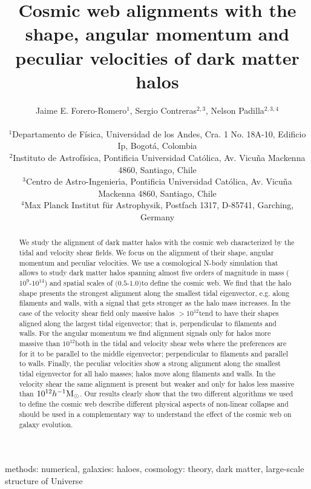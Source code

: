 \documentclass[useAMS,usenatbib]{mn2e}
\newcommand{\hMpc}{{\ifmmode{h^{-1}{\rm Mpc}}\else{$h^{-1}$Mpc }\fi}}
\newcommand{\hMsun}{{\ifmmode{h^{-1}{\rm
        {M_{\odot}}}}\else{$h^{-1}{\rm{M_{\odot}}}$~}\fi}}
\begin{document}
\title[Halo alignments with the cosmic web]{Cosmic web alignments with
  the shape, angular momentum and peculiar velocities of dark matter
  halos}  
\author[J.E. Forero-Romero et al.]{
\parbox[t]{\textwidth}{\raggedright
  Jaime E. Forero-Romero$^{1}$,
  Sergio Contreras$^{2,3}$,
  Nelson Padilla$^{2,3,4}$
}
\vspace*{6pt}\\
$^{1}$Departamento de F\'{i}sica, Universidad de los Andes, Cra. 1
No. 18A-10, Edificio Ip, Bogot\'a, Colombia\\
$^{2}$Instituto de Astrofísica, Pontificia Universidad Cat\'olica,
Av. Vicu\~na Mackenna 4860, Santiago, Chile\\
$^{3}$Centro de Astro-Ingenier\'\i a, Pontificia Universidad Cat\'olica,
Av. Vicu\~na Mackenna 4860, Santiago, Chile\\
$^{4}$Max Planck Institut f\"ur Astrophysik, Postfach 1317, D-85741, Garching, Germany\\
}
\maketitle

\begin{abstract}
We study the alignment of dark matter halos with the cosmic web
characterized by the tidal and velocity shear fields. We focus on the
alignment of their shape, angular momentum and peculiar velocities. We  
use a cosmological N-body simulation that allows to study dark matter
halos spanning almost five orders of magnitude in mass
($10^{9}$-$10^{14}$) \hMsun and spatial scales of
$(0.5$-$1.0)$\hMpc to define the cosmic web. We find that the halo shape
presents the strongest alignment along the smallest tidal eigenvector,
e.g. along filaments and walls, with a signal that gets stronger as
the halo mass increases. In the case of the velocity shear field only 
massive halos $>10^{12}$\hMsun tend to have their shapes aligned along
the largest tidal eigenvector; that is, perpendicular to filaments and
walls. For the angular momentum we find alignment signals only for
halos more massive than $10^{12}$\hMsun both in the tidal and velocity
shear webs where the preferences are for it to be parallel to the
middle eigenvector; perpendicular to filaments and parallel to
walls. Finally, the peculiar velocities show a strong alignment along
the smallest tidal eigenvector for all halo masses; halos move along filaments
and walls. In the velocity shear the same alignment is present but
weaker and only for halos less massive than $10^{12}\hMsun$. Our
results clearly show that the two different algorithms we used to
define the cosmic web describe different physical aspects of
non-linear collapse and should be used in a complementary way to
understand the effect of the cosmic web on galaxy evolution.    
\end{abstract}
\begin{keywords}
methods: numerical, galaxies: haloes, cosmology: theory, dark
matter, large-scale structure of Universe
\end{keywords}
\end{document}

